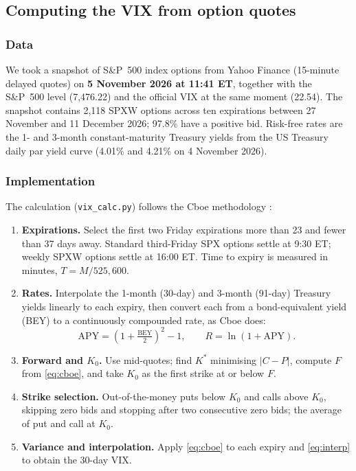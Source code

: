 
\subsection{Computing the VIX from option quotes}
\subsubsection{Data}

We took a snapshot of S\&P~500 index options from Yahoo Finance (15-minute delayed quotes) on \textbf{5 November 2026 at 11:41 ET}, together with the S\&P~500 level (7,476.22) and the official VIX at the same moment (22.54). The snapshot contains 2,118 SPXW options across ten expirations between 27 November and 11 December 2026; 97.8\% have a positive bid. Risk-free rates are the 1- and 3-month constant-maturity Treasury yields from the US Treasury daily par yield curve (4.01\% and 4.21\% on 4 November 2026).

\subsubsection{Implementation}

The calculation (\texttt{vix\_calc.py}) follows the Cboe methodology \cite{cboemeth}:
\begin{enumerate}
  \item \textbf{Expirations.} Select the first two Friday expirations more than 23 and fewer than 37 days away. Standard third-Friday SPX options settle at 9:30 ET; weekly SPXW options settle at 16:00 ET. Time to expiry is measured in minutes, $T=M/525{,}600$.
  \item \textbf{Rates.} Interpolate the 1-month (30-day) and 3-month (91-day) Treasury yields linearly to each expiry, then convert each from a bond-equivalent yield (BEY) to a continuously compounded rate, as Cboe does:
  \[ \mathrm{APY}=\left(1+\tfrac{\mathrm{BEY}}{2}\right)^2-1, \qquad R=\ln(1+\mathrm{APY}). \]
  \item \textbf{Forward and $K_0$.} Use mid-quotes; find $K^*$ minimising $|C-P|$, compute $F$ from \eqref{eq:cboe}, and take $K_0$ as the first strike at or below $F$.
  \item \textbf{Strike selection.} Out-of-the-money puts below $K_0$ and calls above $K_0$, skipping zero bids and stopping after two consecutive zero bids; the average of put and call at $K_0$.
  \item \textbf{Variance and interpolation.} Apply \eqref{eq:cboe} to each expiry and \eqref{eq:interp} to obtain the 30-day VIX.
\end{enumerate}

